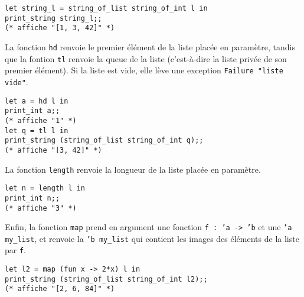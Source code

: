 \documentclass[french]{article}
\begin{document}
\begin{leftbar}
\begin{verbatim}
let string_l = string_of_list string_of_int l in
print_string string_l;;
(* affiche "[1, 3, 42]" *)
\end{verbatim}
\end{leftbar}

La fonction \texttt{hd} renvoie le premier élément de la liste placée en paramètre, tandis que la fontion \texttt{tl} renvoie la queue de la liste (c'est-à-dire la liste privée de son premier élément). Si la liste est vide, elle lève une exception \texttt{Failure "liste vide"}.

\begin{leftbar}
\begin{verbatim}
let a = hd l in
print_int a;;
(* affiche "1" *)
let q = tl l in
print_string (string_of_list string_of_int q);;
(* affiche "[3, 42]" *)
\end{verbatim}
\end{leftbar}

La fonction \texttt{length} renvoie la longueur de la liste placée en paramètre.

\begin{leftbar}
\begin{verbatim}
let n = length l in
print_int n;;
(* affiche "3" *)
\end{verbatim}
\end{leftbar}

Enfin, la fonction \texttt{map} prend en argument une fonction \texttt{f : 'a -> 'b} et une \texttt{'a my\_list}, et renvoie la \texttt{'b my\_list} qui contient les images des éléments de la liste par \texttt{f}.

\begin{leftbar}
\begin{verbatim}
let l2 = map (fun x -> 2*x) l in
print_string (string_of_list string_of_int l2);;
(* affiche "[2, 6, 84]" *)
\end{verbatim}
\end{leftbar}
\end{document}
